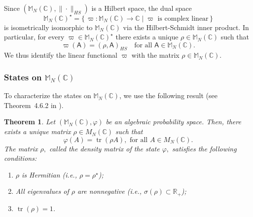 \documentclass[a4paper,11pt]{article}
\newtheorem{theorem}{Theorem}[section]
\DeclareMathOperator{\tr}{tr}
\newcommand{\rA}{\mathsf{A}}
\begin{document}
Since $(\mathbb{M}_N(\mathbb{C}),\|\cdot\|_{HS})$ is a Hilbert space, the dual space
\[
\mathbb{M}_N(\mathbb{C})^{\star} = \{\,\varpi: \mathbb{M}_N(\mathbb{C}) \to \mathbb{C} \mid \varpi \text{ is complex linear} \,\}
\]
is isometrically isomorphic to \(\mathbb{M}_N(\mathbb{C})\) via the Hilbert-Schmidt inner product. In particular, for every \(\varpi \in \mathbb{M}_N(\mathbb{C})^{\star}\) there exists a unique \(\rho \in \mathbb{M}_N(\mathbb{C})\) such that
\[
\varpi(\rA) = (\rho, \rA)_{HS} \quad \text{for all } \rA \in \mathbb{M}_N(\mathbb{C}).
\]
We thus identify the linear functional \(\varpi\) with the matrix \(\rho \in \mathbb{M}_N(\mathbb{C})\).

\subsubsection{States on $\mathbb{M}_N(\mathbb{C})$}

To characterize the states on \(\mathbb{M}_N(\mathbb{C})\), we use the following result (see Theorem~4.6.2 in \cite{FranzPrivault2016}).

\begin{theorem}
  \label{thm:state_density_matrix}
Let $(\mathbb{M}_N(\mathbb{C}),\varphi)$ be an algebraic probability space. Then, there exists a unique matrix $\rho \in M_N(\mathbb{C})$ such that
  \begin{equation}
      \varphi(A) = \operatorname{tr}(\rho A), \text{ for all } A \in M_N(\mathbb{C}).
  \end{equation}
  The matrix $\rho,$ called the \emph{density matrix} of the state $\varphi,$ satisfies the following conditions:
  \begin{enumerate}
    \item[(a)] \(\rho\) is Hermitian (i.e., \(\rho = \rho^{\star}\));
    \item[(b)] All eigenvalues of \(\rho\) are nonnegative (i.e., \(\sigma(\rho) \subset \mathbb{R}_+\));
    \item[(c)] \(\tr(\rho) = 1\).
  \end{enumerate}
  \end{theorem}
\end{document}
